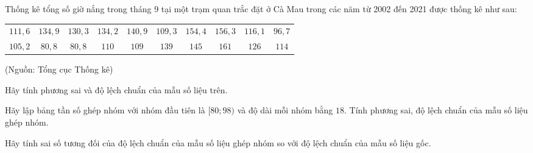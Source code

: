 \begin{vd}
	Thống kê tổng số giờ nắng trong tháng 9 tại một trạm quan trắc đặt ở Cà Mau trong các năm từ 2002 đến 2021 được thống kê như sau:
	\begin{center}
		\begin{tabular}{cccccccccc}
			$ 111,6 $ & $ 134,9 $ & $ 130,3 $ & $ 134,2 $ & $ 140,9 $ & $ 109,3 $ & $ 154,4 $ & $ 156,3 $ & $ 116,1 $ & $ 96,7 $ \\
			$ 105,2 $ & $ 80,8 $  & $ 80,8 $  & $ 110 $   & $ 109 $   & $ 139 $   & $ 145 $   & $ 161 $   & $ 126 $   & $ 114 $
		\end{tabular}
	\end{center}
	\begin{flushright}
		(Nguồn: Tổng cục Thống kê)
	\end{flushright}
	\begin{enumEX}{1}
		\item Hãy tính phương sai và độ lệch chuẩn của mẫu số liệu trên.
		\item Hãy lập bảng tần số ghép nhóm với nhóm đầu tiên là $[80; 98)$ và độ dài mỗi nhóm bằng $ 18 $. Tính phương sai, độ lệch chuẩn của mẫu số liệu ghép nhóm.
		\item Hãy tính sai số tương đối của độ lệch chuẩn của mẫu số liệu ghép nhóm so với độ lệch chuẩn của mẫu số liệu gốc.
	\end{enumEX}
	\loigiai{
		\begin{enumEX}{1}
			\item Cỡ mẫu là $n=20$.\\
			Số trung bình của mẫu số liệu trên là
			$$\bar{x}_1=\dfrac{111,6+134,9+\cdots+114}{20}=122,755.$$
			Phương sai của mẫu số liệu trên là
			$$S_1^2=\dfrac{1}{20}\left(111,6^2+134,9^2+\cdots+114^2\right)-122,755^2 \approx 515,453.$$
			Độ lệch chuẩn của mẫu số liệu trên là
			$$S_1 \approx \sqrt{515,453} \approx 22,704.$$
			\item Ta có bảng sau:
			\begin{center}
				\begin{tabular}{|c|c|c|c|c|c|}
					\hline Số giờ nắng      & {$[80; 98)$} & {$[98; 116)$} & {$[116; 134)$} & {$[134; 152)$} & {$[152; 170)$} \\
					\hline Giá trị đại diện & 89           & 107           & 125            & 143            & 161            \\
					\hline Số năm           & 3            & 6             & 3              & 5              & 3              \\
					\hline

\end{tabular}
\end{center}
\end{enumEX}}
\end{vd}
